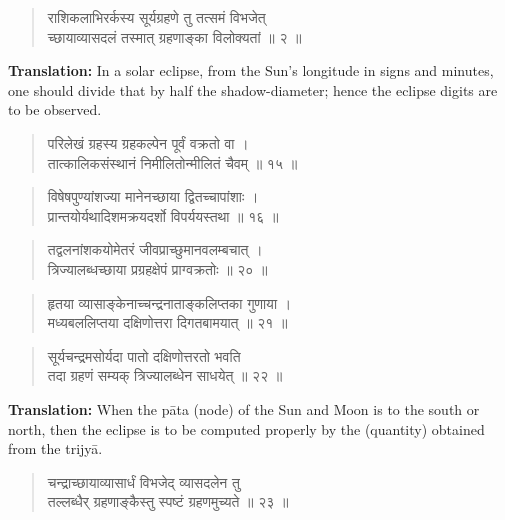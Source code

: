 \documentclass[11pt,a4paper]{article}
\newenvironment{shloka}{\begin{verse}\devanagarifont\large}{\end{verse}}
\begin{document}
\vspace{0.3cm}

\begin{shloka}
राशिकलाभिरर्कस्य सूर्यग्रहणे तु तत्समं विभजेत् \\
च्छायाव्यासदलं तस्मात् ग्रहणाङ्का विलोक्यतां ॥ २ ॥
\end{shloka}

\textbf{Translation:}\quad
In a solar eclipse, from the Sun's longitude in signs and minutes,
one should divide that by half the shadow-diameter; hence the eclipse
digits are to be observed.

\vspace{0.3cm}

\begin{shloka}
परिलेखं ग्रहस्य ग्रहकल्पेन पूर्वं वक्रतो वा ।\\
तात्कालिकसंस्थानं निमीलितोन्मीलितं चैवम् ॥ १५ ॥
\end{shloka}

\begin{shloka}
विषेषपुण्यांशज्या मानेनच्छाया द्वितच्चापांशाः ।\\
प्रान्तयोर्यथादिशमक्रयदर्शो विपर्ययस्तथा ॥ १६ ॥
\end{shloka}

\begin{shloka}
तद्वलनांशकयोमेतरं जीवप्राच्छुमानवलम्बचात् ।\\
त्रिज्यालब्धच्छाया प्रग्रहक्षेपं प्राग्वक्रतोः ॥ २० ॥
\end{shloka}

\begin{shloka}
हृतया व्यासाङ्केनाच्चन्द्रनाताङ्कलिप्तका गुणाया ।\\
मध्यबललिप्तया दक्षिणोत्तरा दिगतबामयात् ॥ २१ ॥
\end{shloka}

\begin{shloka}
सूर्यचन्द्रमसोर्यदा पातो दक्षिणोत्तरतो भवति \\
तदा ग्रहणं सम्यक् त्रिज्यालब्धेन साधयेत् ॥ २२ ॥
\end{shloka}

\textbf{Translation:}\quad
When the pāta (node) of the Sun and Moon is to the south or north,
then the eclipse is to be computed properly by the (quantity)
obtained from the trijyā.

\vspace{0.3cm}

\begin{shloka}
चन्द्राच्छायाव्यासार्धं विभजेद् व्यासदलेन तु \\
तल्लब्धैर् ग्रहणाङ्कैस्तु स्पष्टं ग्रहणमुच्यते ॥ २३ ॥
\end{shloka}
\end{document}
